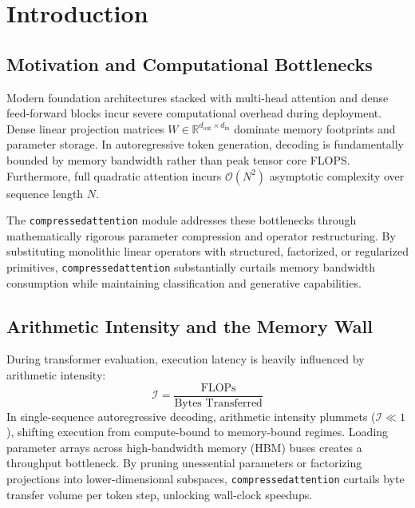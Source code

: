 \section{Introduction}

\subsection{Motivation and Computational Bottlenecks}
Modern foundation architectures stacked with multi-head attention and dense feed-forward blocks incur severe computational overhead during deployment. Dense linear projection matrices $W \in \mathbb{R}^{d_{\text{out}} \times d_{\text{in}}}$ dominate memory footprints and parameter storage. In autoregressive token generation, decoding is fundamentally bounded by memory bandwidth rather than peak tensor core FLOPS. Furthermore, full quadratic attention incurs $\mathcal{O}(N^2)$ asymptotic complexity over sequence length $N$.

The \texttt{compressedattention} module addresses these bottlenecks through mathematically rigorous parameter compression and operator restructuring. By substituting monolithic linear operators with structured, factorized, or regularized primitives, \texttt{compressedattention} substantially curtails memory bandwidth consumption while maintaining classification and generative capabilities.

\subsection{Arithmetic Intensity and the Memory Wall}
During transformer evaluation, execution latency is heavily influenced by arithmetic intensity:
\[
\mathcal{I} = \frac{\text{FLOPs}}{\text{Bytes Transferred}}
\]
In single-sequence autoregressive decoding, arithmetic intensity plummets ($\mathcal{I} \ll 1$), shifting execution from compute-bound to memory-bound regimes. Loading parameter arrays across high-bandwidth memory (HBM) buses creates a throughput bottleneck. By pruning unessential parameters or factorizing projections into lower-dimensional subspaces, \texttt{compressedattention} curtails byte transfer volume per token step, unlocking wall-clock speedups.

